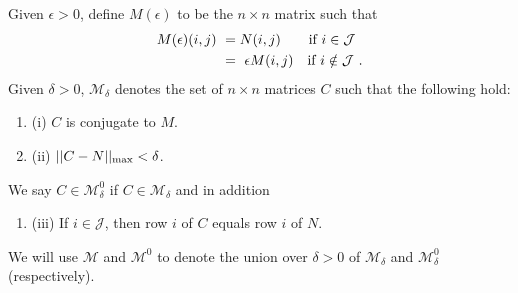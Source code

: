 \documentclass{amsart}
\theoremstyle{definition}
\theoremstyle{remark}
\numberwithin{equation}{section}
\begin{document}
{{Given $\epsilon >0$, define 
$M(\epsilon )$ to be the $n\times n$ 
matrix such that 
\begin{align*} 
M(\epsilon )(i,j) \ &=  N(i,j)\quad \ \ \  \textnormal{if } i\in \mathcal J \\
\ &= \ \epsilon M(i,j)\quad \textnormal{if } i\notin \mathcal J \ . 
\end{align*} 
Given $\delta > 0$, $\mathcal M_{\delta}$ denotes the set of 
$n\times n$ matrices 
$C$ such that the following hold: 
\begin{enumerate}
\item[] (i) 
$C$ is conjugate to $M$.
\item[] (ii) 
$||C-N||_{\textnormal{max}}< \delta$. 
\end{enumerate} 
We say $C\in \mathcal M^0_{\delta}$ if
$C\in \mathcal M_{\delta}$ and 
 in addition  
\begin{enumerate}  
\item[] (iii)  
If $i\in \mathcal J$, then row $i$ of $C$ equals row $i$ of $N$. 
\end{enumerate} 
We will use $\mathcal M$ and $\mathcal M^0$ to denote the union 
over $\delta >0$ of 
$ \mathcal M_{\delta}$ and 
$ \mathcal M^0_{\delta}$ 
 (respectively). 


}}
\end{document}
